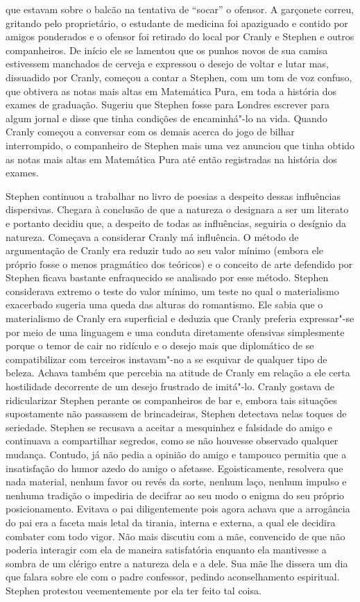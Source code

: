 que estavam sobre o balcão na tentativa de “socar” o ofensor.  A
garçonete correu, gritando pelo proprietário, o estudante de medicina
foi apaziguado e contido por amigos ponderados e o ofensor foi retirado
do local por Cranly e Stephen e outros companheiros.  De início ele se
lamentou que os punhos novos de sua camisa estivessem manchados de
cerveja e expressou o desejo de voltar e lutar mas, dissuadido por
Cranly, começou a contar a Stephen, com um tom de voz confuso, que
obtivera as notas mais altas em Matemática Pura, em toda a história dos
exames de graduação.  Sugeriu que Stephen fosse para Londres escrever
para algum jornal e disse que tinha condições de encaminhá"-lo na vida. 
Quando Cranly começou a conversar com os demais acerca do jogo de
bilhar interrompido, o companheiro de Stephen mais uma vez anunciou que
tinha obtido as notas mais altas em Matemática Pura até então
registradas na história dos exames.

Stephen continuou a trabalhar no livro de poesias a despeito dessas
influências dispersivas.  Chegara à conclusão de que a natureza o
designara a ser um literato e portanto decidiu que, a despeito de todas
as influências, seguiria o desígnio da natureza.  Começava a considerar
Cranly má influência.  O método de argumentação de Cranly era reduzir
tudo ao seu valor mínimo (embora ele próprio fosse o menos pragmático
dos teóricos) e o conceito de arte defendido por Stephen ficava
bastante enfraquecido se analisado por esse método.  Stephen
considerava extremo o teste do valor mínimo, um teste no qual o
materialismo exacerbado sugeria uma queda das alturas do romantismo. 
Ele sabia que o materialismo de Cranly era superficial e deduzia que
Cranly preferia expressar"-se por meio de uma linguagem e uma conduta
diretamente ofensivas simplesmente porque o temor de cair no ridículo e
o desejo mais que diplomático de se compatibilizar com terceiros
instavam"-no a se esquivar de qualquer tipo de beleza.  Achava também
que percebia na atitude de Cranly em relação a ele certa hostilidade
decorrente de um desejo frustrado de imitá"-lo.  Cranly gostava de
ridicularizar Stephen perante os companheiros de bar e, embora tais
situações supostamente não passassem de brincadeiras, Stephen detectava
nelas toques de seriedade.  Stephen se recusava a aceitar a mesquinhez
e falsidade do amigo e continuava a compartilhar segredos,
como se não houvesse observado qualquer mudança.  Contudo, já não pedia
a opinião do amigo e tampouco permitia que a insatisfação do humor
azedo do amigo o afetasse.  Egoisticamente, resolvera que nada
material, nenhum favor ou revés da sorte, nenhum laço, nenhum impulso e
nenhuma tradição o impediria de decifrar ao seu modo o enigma do seu
próprio posicionamento.  Evitava o pai diligentemente pois agora achava
que a arrogância do pai era a faceta mais letal da tirania, interna e
externa, a qual ele decidira combater com todo vigor.  Não mais
discutiu com a mãe, convencido de que não poderia interagir com ela de
maneira satisfatória enquanto ela mantivesse a sombra de um clérigo
entre a natureza dela e a dele.  Sua mãe lhe dissera um dia que falara
sobre ele com o padre confessor, pedindo aconselhamento espiritual. 
Stephen protestou veementemente por ela ter feito tal coisa.

